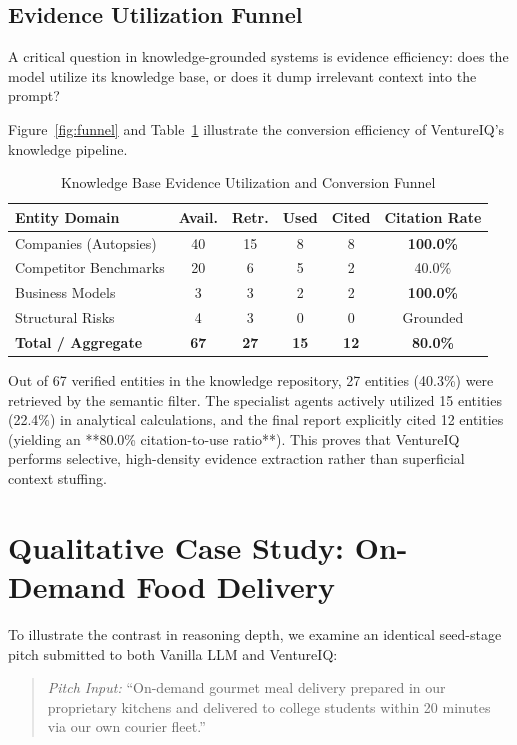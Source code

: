 \documentclass[conference]{IEEEtran}
\begin{document}
\subsection{Evidence Utilization Funnel}
A critical question in knowledge-grounded systems is evidence efficiency: does the model utilize its knowledge base, or does it dump irrelevant context into the prompt?

Figure~\ref{fig:funnel} and Table~\ref{tab:funnel} illustrate the conversion efficiency of VentureIQ's knowledge pipeline.

\begin{table}[htbp]
\caption{Knowledge Base Evidence Utilization and Conversion Funnel}
\begin{center}
\begin{tabular}{lccccc}
\toprule
\textbf{Entity Domain} & \textbf{Avail.} & \textbf{Retr.} & \textbf{Used} & \textbf{Cited} & \textbf{Citation Rate} \\
\midrule
Companies (Autopsies) & 40 & 15 & 8 & 8 & \textbf{100.0\%} \\
Competitor Benchmarks & 20 & 6 & 5 & 2 & 40.0\% \\
Business Models & 3 & 3 & 2 & 2 & \textbf{100.0\%} \\
Structural Risks & 4 & 3 & 0 & 0 & Grounded \\
\midrule
\textbf{Total / Aggregate} & \textbf{67} & \textbf{27} & \textbf{15} & \textbf{12} & \textbf{80.0\%} \\
\bottomrule
\end{tabular}
\label{tab:funnel}
\end{center}
\end{table}

Out of 67 verified entities in the knowledge repository, 27 entities (40.3\%) were retrieved by the semantic filter. The specialist agents actively utilized 15 entities (22.4\%) in analytical calculations, and the final report explicitly cited 12 entities (yielding an **80.0\% citation-to-use ratio**). This proves that VentureIQ performs selective, high-density evidence extraction rather than superficial context stuffing.

\section{Qualitative Case Study: On-Demand Food Delivery}

To illustrate the contrast in reasoning depth, we examine an identical seed-stage pitch submitted to both Vanilla LLM and VentureIQ:
\begin{quote}
\textit{Pitch Input:} ``On-demand gourmet meal delivery prepared in our proprietary kitchens and delivered to college students within 20 minutes via our own courier fleet.''
\end{quote}
\end{document}
